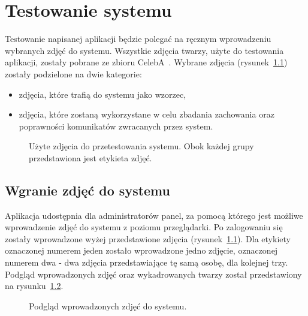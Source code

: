 

\chapter{Testowanie systemu}

Testowanie napisanej aplikacji będzie polegać na ręcznym wprowadzeniu wybranych zdjęć do systemu.
Wszystkie zdjęcia twarzy, użyte do testowania aplikacji, zostały pobrane ze zbioru CelebA~\cite{microsoft-2020-celeb1m}.
Wybrane zdjęcia (rysunek~\ref{fig:zdjeciadotestow}) zostały podzielone na dwie kategorie:

\begin{itemize}
    \item zdjęcia, które trafią do systemu jako wzorzec,
    \item zdjęcia, które zostaną wykorzystane w celu zbadania zachowania oraz poprawności
    komunikatów zwracanych przez system.
\end{itemize}

\begin{figure}[H]
    \centering
    \caption{Użyte zdjęcia do przetestowania systemu. Obok każdej grupy przedstawiona jest etykieta zdjęć.}
    \customsource
    \label{fig:zdjeciadotestow}
\end{figure}

\pagebreak


\section{Wgranie zdjęć do systemu}

Aplikacja udostępnia dla administratorów panel, za pomocą którego jest możliwe wprowadzenie
zdjęć do systemu z poziomu przeglądarki.
Po zalogowaniu się zostały wprowadzone wyżej przedstawione zdjęcia (rysunek~\ref{fig:zdjeciadotestow}).
Dla etykiety oznaczonej numerem jeden zostało wprowadzone jedno zdjęcie,
oznaczonej numerem dwa - dwa zdjęcia przedstawiające tę samą osobę, dla kolejnej trzy.
Podgląd wprowadzonych zdjęć oraz wykadrowanych twarzy został przedstawiony na rysunku~\ref{fig:po_wprowadzeniu}.

\begin{figure}[H]
    \centering
    \caption{ Podgląd wprowadzonych zdjęć do systemu. }
    \customsource
    \label{fig:po_wprowadzeniu}
\end{figure}

